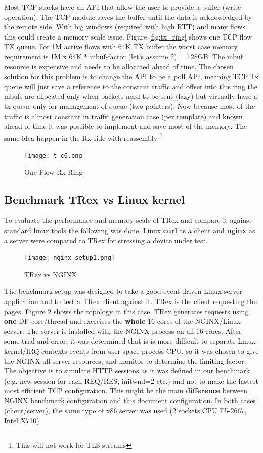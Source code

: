 \documentclass[conference]{IEEEtran}
\begin{document}
Most TCP stacks have an API that allow the user to provide a buffer (write operation). 
The TCP module saves the buffer until the data is acknowledged by the remote side. 
With big windows (required with high RTT) and many flows this could create a memory scale issue. 
Figure \ref{fig:tx_ring} shows one TCP flow TX queue. For 1M active flows with 64K TX buffer 
the worst case memory requirement is 1M x 64K * mbuf-factor (let's assume 2) = 128GB. 
The mbuf resource is expensive and needs to be allocated ahead of time. 
The chosen solution for this problem is to change the API to be a poll API, 
meaning TCP Tx queue will just save a reference to the constant traffic and offset into this ring the mbufs are allocated only when packets need to be sent (lazy) but virtually have a tx queue only for management of queue (two pointers). 
Now because most of the traffic is almost constant in traffic generation case (per template) and known ahead of time it was possible to implement and save most of the memory.
The same idea happen in the Rx side with reassembly \footnote{This will not work for TLS streams}

\begin{figure}[h]
  \texttt{[image: t\_c6.png]}
  \caption{One Flow Rx Ring}
  \label{fig:rx_ring}
\end{figure}


\subsection{Benchmark  TRex vs Linux kernel}

To evaluate the performance and memory scale of TRex and compare it against standard linux tools the following was done. 
Linux \textbf{curl} as a client and \textbf{nginx} as a server were compared to TRex for stressing a device under test.

\begin{figure}[h]
  \texttt{[image: nginx\_setup1.png]}
  \caption{TRex vs NGINX}
  \label{fig:trex_nginx}
\end{figure}

The benchmark setup was designed to take a good event-driven Linux server application and to test a TRex client against it. 
TRex is the client requesting the pages. Figure \ref{fig:trex_nginx} shows the topology in this case.
TRex generates requests using \textbf{one} DP core/thread and exercises the \textbf{whole} 16 cores of the NGINX/Linux server. 
The server is installed with the NGINX process on all 16 cores.  
After some trial and error, it was determined that is is more difficult to separate Linux kernel/IRQ contexts events from user space process CPU, 
so it was chosen to give the NGINX all server resources, and monitor to determine the limiting factor.
The objective is to simulate HTTP sessions as it was defined in our benchmark (e.g. new session for each REQ/RES, initwnd=2 etc.) 
and not to make the fastest most efficient TCP configuration. 
This might be the main \textbf{difference} between NGINX benchmark configuration and this document configuration. 
In both cases (client/server), the same type of x86 server was used (2 sockets,CPU E5-2667, Intel X710)
\end{document}
